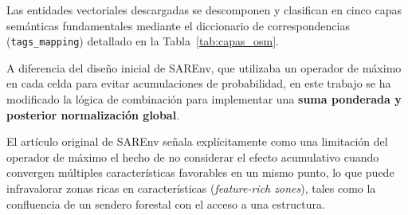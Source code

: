 Las entidades vectoriales descargadas se descomponen y clasifican en cinco capas semánticas fundamentales mediante el diccionario de correspondencias (\texttt{tags\_mapping}) detallado en la Tabla~\ref{tab:capas_osm}.

\begin{table}[H]
	{\label{tab:capas_osm}
	}
\end{table}

A diferencia del diseño inicial de SAREnv, que utilizaba un operador de máximo en cada celda para evitar acumulaciones de probabilidad, en este trabajo se ha modificado la lógica de combinación para implementar una \textbf{suma ponderada y posterior normalización global}. 

El artículo original de SAREnv \cite{drones9090628} señala explícitamente como una limitación del operador de máximo el hecho de no considerar el efecto acumulativo cuando convergen múltiples características favorables en un mismo punto, lo que puede infravalorar zonas ricas en características (\textit{feature-rich zones}), tales como la confluencia de un sendero forestal con el acceso a una estructura.

